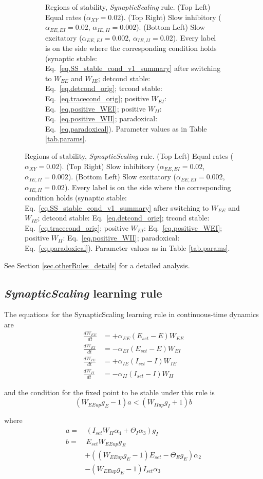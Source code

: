 \documentclass[twocolumn]{article}
\newcommand{\EE}{\mathit{EE}}
\newcommand{\EI}{\mathit{EI}}
\newcommand{\IE}{\mathit{IE}}
\newcommand{\II}{\mathit{II}}
\newcommand{\XY}{\mathit{XY}}
\newcommand{\set}{\mathit{set}}
\newcommand{\up}{\mathit{up}}
\begin{document}
\begin{figure}[!ht]
{\begin{figure}[H]
\caption{Regions of stability, {\em SynapticScaling} rule. (Top Left) Equal rates ($\alpha_{\XY}=0.02$). (Top Right) Slow inhibitory ($\alpha_{\EE,\EI}=0.02$, $\alpha_{\IE,\II}=0.002$). (Bottom Left) Slow excitatory ($\alpha_{\EE,\EI}=0.002$, $\alpha_{\IE,\II}=0.02$). Every label is on the side where the  corresponding  condition  holds (synaptic stable: Eq.\ \ref{eq.SS_stable_cond_v1_summary} after switching to $W_{\EE}$ and $W_{\IE}$; detcond stable: Eq.\ \ref{eq.detcond_orig}; trcond stable: Eq.\ \ref{eq.tracecond_orig}; positive $W_{\EI}$: Eq.\ \ref{eq.positive_WEI}; positive $W_{\II}$: Eq.\ \ref{eq.positive_WII}; paradoxical: Eq.\ \ref{eq.paradoxical}). Parameter values as in Table \ref{tab.params}.}
\label{fig.SS_stability}
\end{figure}}
\end{figure}




See Section \ref{sec.otherRules_details} for a detailed analysis.



\subsection{{\em SynapticScaling} learning rule}


The equations for the SynapticScaling learning rule in continuous-time dynamics are
\begin{equation}
\begin{aligned}
\frac{dW_{\EE}}{dt} & = +\alpha_{\EE} (E_{\set} - E) W_{\EE} \\
\frac{dW_{\EI}}{dt} & = -\alpha_{\EI} (E_{\set} - E) W_{\EI} \\
\frac{dW_{\IE}}{dt} & = +\alpha_{\IE} (I_{\set} - I) W_{\IE} \\
\frac{dW_{\II}}{dt} & = -\alpha_{\II} (I_{\set} - I) W_{\II}
\end{aligned}
\label{eq.SS_summary}
\end{equation}

\noindent and the condition for the fixed point to be stable under this rule is
\begin{equation}
(W_{\EE\up}g_E - 1)a < (W_{\II\up}g_I + 1)b
\label{eq.SS_stable_cond_v1_summary}
\end{equation}

\noindent where
\begin{displaymath}
\begin{aligned}
a = & \, (I_{\set} W_{\II} \alpha_4 + \Theta_I \alpha_3)g_I \\
b = & \, E_{\set} W_{\EE\up}g_E \\
& + ((W_{\EE\up} g_E - 1) E_{\set} - \Theta_E g_E)\alpha_2 \\
& - (W_{\EE\up} g_E - 1) I_{\set} \alpha_3
\end{aligned}
\end{displaymath}
\end{document}
